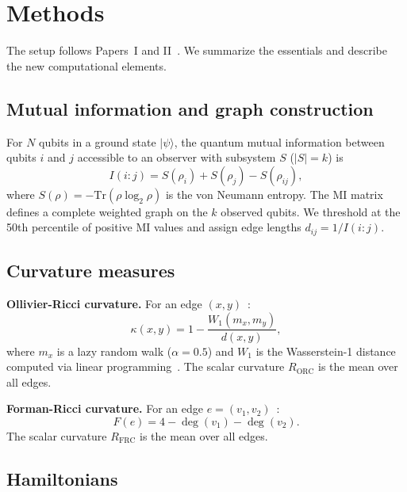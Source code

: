 \documentclass[aps,pra,twocolumn,superscriptaddress,floatfix]{revtex4-2}
\begin{document}
\section{Methods}
\label{sec:methods}

The setup follows Papers~I and II~\cite{glass2026plc1,glass2026plc2}.  We summarize the essentials and describe the new computational elements.

\subsection{Mutual information and graph construction}

For $N$ qubits in a ground state $|\psi\rangle$, the quantum mutual information between qubits $i$ and $j$ accessible to an observer with subsystem $S$ ($|S| = k$) is
\begin{equation}
I(i{:}j) = S(\rho_i) + S(\rho_j) - S(\rho_{ij}),
\end{equation}
where $S(\rho) = -\mathrm{Tr}(\rho \log_2 \rho)$ is the von Neumann entropy.  The MI matrix defines a complete weighted graph on the $k$ observed qubits.  We threshold at the 50th percentile of positive MI values and assign edge lengths $d_{ij} = 1/I(i{:}j)$.

\subsection{Curvature measures}

\textbf{Ollivier-Ricci curvature.}  For an edge $(x,y)$~\cite{ollivier2009}:
\begin{equation}
\kappa(x,y) = 1 - \frac{W_1(m_x, m_y)}{d(x,y)},
\end{equation}
where $m_x$ is a lazy random walk ($\alpha = 0.5$) and $W_1$ is the Wasserstein-1 distance computed via linear programming~\cite{villani2009}.  The scalar curvature $R_\mathrm{ORC}$ is the mean over all edges.

\textbf{Forman-Ricci curvature.}  For an edge $e = (v_1, v_2)$~\cite{forman2003}:
\begin{equation}
F(e) = 4 - \deg(v_1) - \deg(v_2).
\end{equation}
The scalar curvature $R_\mathrm{FRC}$ is the mean over all edges.

\subsection{Hamiltonians}
\end{document}
